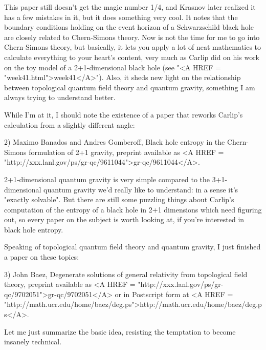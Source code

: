 This paper still doesn't get the magic number 1/4, and Krasnov later
realized it has a few mistakes in it, but it does something very cool.
It notes that the boundary conditions holding on the event horizon of
a Schwarzschild black hole are closely related to Chern-Simons theory.
Now is not the time for me to go into Chern-Simons theory, but
basically, it lets you apply a lot of neat mathematics to calculate
everything to your heart's content, very much as Carlip did on his
work on the toy model of a 2+1-dimensional black hole (see "<A HREF = "week41.html">week41</A>").
Also, it sheds new light on the relationship between topological
quantum field theory and quantum gravity, something I am always trying
to understand better.

While I'm at it, I should note the existence of a paper that reworks
Carlip's calculation from a slightly different angle:

2) Maximo Banados and Andres Gomberoff, Black hole entropy in the 
Chern-Simons formulation of 2+1 gravity, preprint available as
<A HREF = "http://xxx.lanl.gov/ps/gr-qc/9611044">gr-qc/9611044</A>.

2+1-dimensional quantum gravity is very simple compared to the
3+1-dimensional quantum gravity we'd really like to understand: in a
sense it's "exactly solvable".  But there are still some puzzling
things about Carlip's computation of the entropy of a black hole in
2+1 dimensions which need figuring out, so every paper on the subject
is worth looking at, if you're interested in black hole entropy.

Speaking of topological quantum field theory and quantum gravity, I just
finished a paper on these topics:

3) John Baez, Degenerate solutions of general relativity from topological
field theory, preprint available as <A HREF = "http://xxx.lanl.gov/ps/gr-qc/9702051">gr-qc/9702051</A> or in Postscript
form at <A HREF = "http://math.ucr.edu/home/baez/deg.ps">http://math.ucr.edu/home/baez/deg.ps</A>.

Let me just summarize the basic idea, resisting the temptation to 
become insanely technical.  

